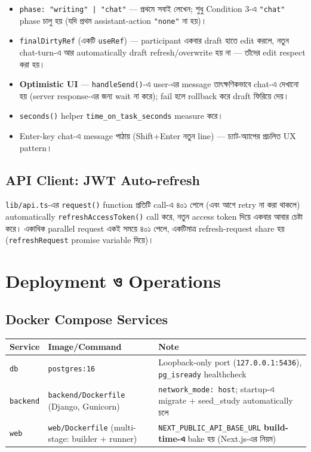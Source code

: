 \documentclass[11pt,a4paper]{article}
\newcommand{\code}[1]{\texttt{\small #1}}
\newcommand{\file}[1]{\texttt{\small #1}}
\begin{document}
\begin{itemize}
\item \code{phase: "writing" | "chat"} --- প্রথমে সবাই লেখেন; শুধু Condition 3-এ
  \code{"chat"} phase চালু হয় (যদি প্রথম assistant-action \code{"none"} না হয়)।
\item \code{finalDirtyRef} (একটি \code{useRef}) --- participant একবার draft হাতে edit
  করলে, নতুন chat-turn-এ আর automatically draft refresh/overwrite হয় না --- তাঁদের edit
  respect করা হয়।
\item \textbf{Optimistic UI} --- \code{handleSend()}-এ user-এর message তাৎক্ষণিকভাবে chat-এ
  দেখানো হয় (server response-এর জন্য wait না করে); fail হলে rollback করে draft ফিরিয়ে দেয়।
\item \code{seconds()} helper \code{time\_on\_task\_seconds} measure করে।
\item Enter-key chat-এ message পাঠায় (Shift+Enter নতুন line) --- চ্যাট-অ্যাপের প্রচলিত UX
  pattern।
\end{itemize}

\subsection{API Client: JWT Auto-refresh}
\file{lib/api.ts}-এর \code{request()} function প্রতিটি call-এ ৪০১ পেলে (এবং আগে retry না করা
থাকলে) automatically \code{refreshAccessToken()} call করে, নতুন access token দিয়ে একবার আবার
চেষ্টা করে। একাধিক parallel request একই সময়ে ৪০১ পেলে, একটিমাত্র refresh-request share হয়
(\code{refreshRequest} promise variable দিয়ে)।

\newpage
\section{Deployment ও Operations}
\label{sec:deploy}

\subsection{Docker Compose Services}
\begin{longtable}{@{}p{2.6cm}p{6.4cm}p{6.8cm}@{}}
\toprule
\textbf{Service} & \textbf{Image/Command} & \textbf{Note} \\
\midrule
\endhead
\code{db} & \code{postgres:16} & Loopback-only port (\code{127.0.0.1:5436}),
  \code{pg\_isready} healthcheck \\
\code{backend} & \file{backend/Dockerfile} (Django, Gunicorn) & \code{network\_mode: host};
  startup-এ migrate + seed\_study automatically চলে \\
\code{web} & \file{web/Dockerfile} (multi-stage: builder + runner) &
  \code{NEXT\_PUBLIC\_API\_BASE\_URL} \textbf{build-time-এ} bake হয় (Next.js-এর নিয়ম) \\
\bottomrule
\end{longtable}
\end{document}

